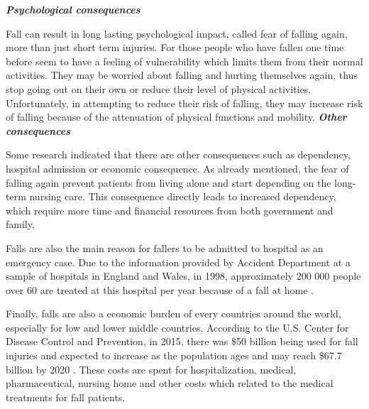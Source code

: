 \documentclass[letterpaper,12pt,titlepage,oneside,final]{book}
\let\origdoublepage\cleardoublepage
\newcommand{\clearemptydoublepage}{%
	\clearpage{\pagestyle{empty}\origdoublepage}}
\let\cleardoublepage\clearemptydoublepage
\begin{document}
\vspace{0.3cm}
\textbf{\textit{Psychological consequences}}\par
Fall can result in long lasting psychological impact, called fear of falling again, more than just short term injuries. For those people who have fallen one time before seem to have a feeling of vulnerability which limits them from their normal activities. They may be worried about falling and hurting themselves again, thus stop going out on their own or reduce their level of physical activities. Unfortunately, in attempting to reduce their risk of falling,  they may increase risk of falling because of the attenuation of physical functions and mobility. 	
\cleardoublepage
\vspace{0.3cm}
\textbf{\textit{Other consequences}}\par
Some research indicated that there are other consequences such as dependency, hospital admission or economic consequence. As already mentioned, the fear of falling again prevent patients from living alone and start depending on the long-term nursing care. This consequence directly leads to increased dependency, which require more time and financial resources from both government and family. \par
Falls are also the main reason for fallers to be admitted to hospital as an emergency case. Due to the information provided by Accident Department at a sample of hospitals in England and Wales, in 1998, approximately 200 000 people over 60 are treated at this hospital per year because of a fall at home \cite{other_consequence_1}.\par
Finally, falls are also a economic burden of every countries around the world, especially for low and lower middle countries. According to the U.S. Center for Disease Control and Prevention, in 2015, there was \$50 billion being used for fall injuries and expected to increase as the population ages and may reach \$67.7 billion by 2020 \cite{ncoa}. These costs are spent for hospitalization, medical, pharmaceutical, nursing home and other costs which related to the medical treatments for fall patients.
\end{document}
